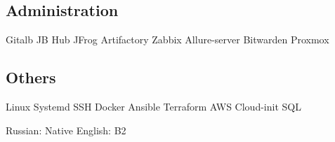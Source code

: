 \documentclass[a4paper]{MagicalCV}
\begin{document}
\begin{minipage}[t]{0.34\textwidth}
\subsection{Administration}
Gitalb \textbullet{} 
JB Hub \textbullet{} 
JFrog Artifactory \textbullet{} 
Zabbix \textbullet{} 
Allure-server \textbullet{} 
Bitwarden \textbullet{} 
Proxmox
\subsection{Others}
Linux \textbullet{} 
Systemd \textbullet{} 
SSH \textbullet{} 
Docker \textbullet{} 
Ansible \textbullet{} 
Terraform \textbullet{} 
AWS \textbullet{} 
Cloud-init \textbullet{} 
SQL
\sectionsep


Russian: Native \textbullet{} English: B2
\sectionsep

\end{minipage} 
\hfill
\end{document}
